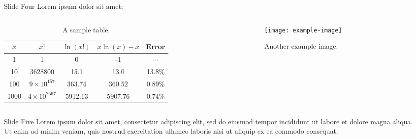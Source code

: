 \documentclass[aspectratio=169]{beamer}  %
\begin{document}

\begin{frame}{Slide Four}
 Lorem ipsum dolor sit amet:
    \begin{columns}
        \begin{column}{0.5\textwidth}
           \begin{framefont}{\footnotesize}
               \begin{table}
                   \centering
                   \begin{tabular}{|c|c|c|c|c|} 
                       \hline
                       $x$ & $x!$ & $\ln(x!)$ & $x\ln(x) - x$ & Error \\ \hline
                       1 & 1 & 0 & -1 & $\cdots$ \\ \hline
                       10 & 3628800 & 15.1 & 13.0 & 13.8\% \\ \hline
                       100 & $9\times 10^{157}$ & 363.74 & 360.52 & 0.89\% \\ \hline
                       1000 & $4\times 10^{2567}$ & 5912.13 & 5907.76 & 0.74\% \\ \hline 
                   \end{tabular} 
                   \caption{A sample table.}
                   \label{tab:table}
               \end{table}
            \end{framefont}
        \end{column}
        \begin{column}{0.4\textwidth}  
            \begin{figure}
                \centering
                \texttt{[image: example-image]}
                \caption{Another example image.}
            \end{figure}
        \end{column}
    \end{columns}
\end{frame}


\begin{frame}[allowframebreaks]{Slide Five}
    Lorem ipsum dolor sit amet, consectetur adipiscing elit, sed do eiusmod tempor incididunt ut labore et dolore magna aliqua. \\ \framebreak
    Ut enim ad minim veniam, quis nostrud exercitation ullamco laboris nisi ut aliquip ex ea commodo consequat.
\end{frame}
\end{document}
